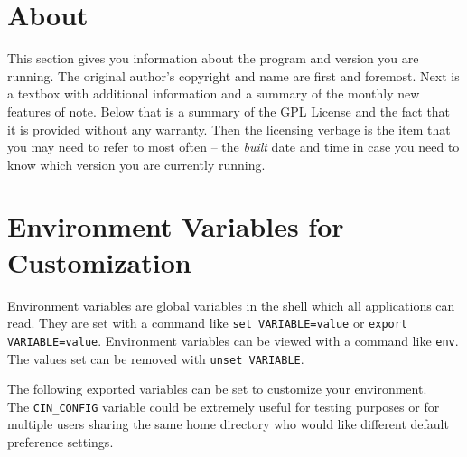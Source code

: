 \section{About}%
\label{sec:about}

This section gives you information about the \CGG{} program and version you are running.  The original author’s copyright and name are first and foremost.  Next is a textbox with additional information and a summary of the monthly new features of note. Below that is a summary of the GPL License and the fact that it is provided without any warranty.  Then the licensing verbage is the item that you may need to refer to most often -- the \textit{built} date and time in case you need to know which version you are currently running.

\section{Environment Variables for Customization}%
\label{sec:environment_variables_customization}

Environment variables are global variables in the shell which all applications can read. They are set with a command like \texttt{set VARIABLE=value} or \texttt{export VARIABLE=value}. Environment variables can be viewed with a command like \texttt{env}.   The values set can be removed with \texttt{unset VARIABLE}.

The following exported variables can be set to customize your environment. \\ The \texttt{CIN\_CONFIG} variable could be extremely useful for testing purposes or for multiple users sharing the same home directory who would like different default preference settings.

